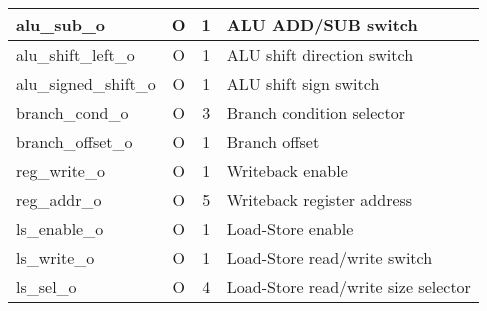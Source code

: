 {\begin{xltabular}{0.9\textwidth}{|l|c|c|X|}
  \hline
  alu\_sub\_o & O & 1 & ALU ADD/SUB switch \\
  \hline
  alu\_shift\_left\_o & O & 1 & ALU shift direction switch \\
  \hline
  alu\_signed\_shift\_o & O & 1 & ALU shift sign switch \\
  \hline
  branch\_cond\_o & O & 3 & Branch condition selector \\
  \hline
  branch\_offset\_o & O & 1 & Branch offset \\
  \hline
  reg\_write\_o & O & 1 & Writeback enable \\
  \hline
  reg\_addr\_o & O & 5 & Writeback register address \\
  \hline
  ls\_enable\_o & O & 1 & Load-Store enable \\
  \hline
  ls\_write\_o & O & 1 & Load-Store read/write switch \\
  \hline
  ls\_sel\_o & O & 4 & Load-Store read/write size selector \\
  \hline
\end{xltabular}
}
